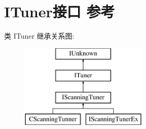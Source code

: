 \hypertarget{interface_i_tuner}{}\section{I\+Tuner接口 参考}
\label{interface_i_tuner}
类 I\+Tuner 继承关系图\+:\begin{figure}[H]
\begin{center}
\leavevmode
\includegraphics[height=4.000000cm]{interface_i_tuner}
\end{center}
\end{figure}
